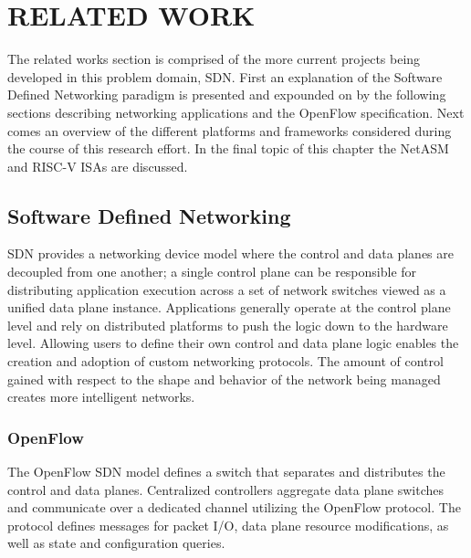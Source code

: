 \chapter{RELATED WORK}
\label{related}
The related works section is comprised of the more current projects being
developed in this problem domain, SDN. First an explanation of the Software
Defined Networking paradigm is presented and expounded on by the following
sections describing networking applications and the OpenFlow \cite{openflow}
specification. Next comes an overview of the different platforms and frameworks
considered during the course of this research effort. In the final topic of
this chapter the NetASM and RISC-V ISAs are discussed.


\section{Software Defined Networking}
\label{related:sdn}
SDN provides a networking device model where the control and data planes are
decoupled from one another; a single control plane can be responsible for
distributing application execution across a set of network switches viewed as
a unified data plane instance. Applications generally operate at the control
plane level and rely on distributed platforms to push the logic down to the
hardware level. Allowing users to define their own control and data plane
logic enables the creation and adoption of custom networking protocols. The
amount of control gained with respect to the shape and behavior of the network
being managed creates more intelligent networks.


\subsection{OpenFlow}
\label{related:of}
The OpenFlow \cite{openflow} SDN model defines a switch that separates and
distributes the control and data planes. Centralized controllers aggregate
data plane switches and communicate over a dedicated channel utilizing the
OpenFlow protocol. The protocol defines messages for packet I/O, data plane
resource modifications, as well as state and configuration queries.

